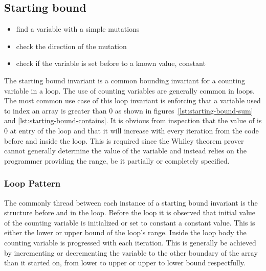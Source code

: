 

\subsection{Starting bound}

\begin{itemize}
	\item find a variable with a simple mutations
	\item check the direction of the mutation
	\item check if the variable is set before to a known value, constant
\end{itemize}

The starting bound invariant is a common bounding invariant for a counting
variable in a loop.
The use of counting variables are generally common in loops.
The most common use case of this loop invariant is enforcing that 
a variable used to index an array is greater than 0 as shown in
figures~\ref{lst:starting-bound-sum} and \ref{lst:starting-bound-contains}.
It is obvious from inspection that the value of  is 0 at entry
of the loop and that it will increase with every iteration from the code before
and inside the loop.
This is required since the Whiley theorem prover cannot generally 
determine the value of the variable and instead relies on the programmer
providing the range, be it partially or completely specified.

\subsubsection{Loop Pattern}

The commonly thread between each instance of a starting bound invariant
is the structure before and in the loop.
Before the loop it is observed that initial value of the counting
variable is initialized or set to constant a constant value.
This is either the lower or upper bound of the loop's range.
Inside the loop body the counting variable is progressed with each
iteration.
This is generally be achieved by incrementing or decrementing the variable
to the other boundary of the array than it started on, from lower to upper or
upper to lower bound respectfully.

